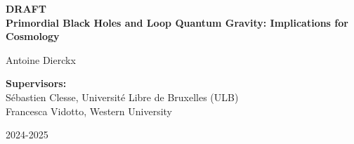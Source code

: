 \begin{titlepage}
    \centering
    \vspace*{1in}
    {\huge \bfseries DRAFT \\ Primordial Black Holes and Loop Quantum Gravity: Implications for Cosmology \par}
    \vspace{1.5in}
    {\Large Antoine Dierckx \par}
    \vfill
    \textbf{Supervisors:} \\[0.5cm]
    Sébastien Clesse, Université Libre de Bruxelles (ULB) \\[0.3cm]
    Francesca Vidotto, Western University \\[2cm]
    \vfill
    {\large 2024-2025 \par}
\end{titlepage}
